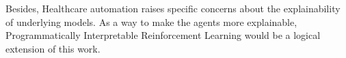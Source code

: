 Besides, Healthcare automation raises specific concerns \cite{health-ai-explainability1,health-ai-explainability2} about the explainability of underlying models. 
As a way to make the agents more explainable, Programmatically Interpretable Reinforcement Learning \cite{pirl,neurogenetic} would be a logical extension of this work.
